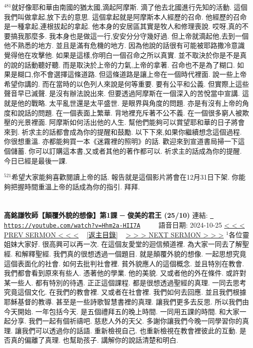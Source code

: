 \documentclass{book}
\begin{document}
$^{481}$就好像耶和華由南國的猶太國,滴起阿摩斯.
滴了他去北國進行先知的活動.
這個我們叫做拿起,放下去的意思.
這個拿起就是阿摩斯本人經歷的召命.
他經歷的召命是一種拿起,連根拔起的拿起.
他本身的安居區其實是牧人和修理喪說.
哎呀,真的不要搞我那麼多.
我本身也是做這一行,安安分分守幾好過.
但上帝就滴起他,去到一個他不熟悉的地方.
並且是滿有危機的地方.
因為他說的話很有可能被耶路撒冷意識覺得他在攻擊他.
如果是這樣,你明白一個召命之所以真實.
並不取決於你是不是真的說的話動聽好聽.
而是取決於上帝的力氣,上帝的拿著.
召命也不是為了糊口.
如果是糊口,你不會選擇這條道路.
但這條道路是讓上帝在一個時代裡面.
說一些上帝希望你講的.
而在當時的以色列人來說是何等重要.
要有公平和公義.
但實際上這些聲音早已滅聲.
是沒有辦法說出來.
但要透過阿摩斯在一個深入的苦悅當中宣講.
這就是他的戰略.
太平亂世還是太平盛世.
是眼界與角度的問題.
亦是有沒有上帝的角度和說話的問題.
在一個表面上繁華.
背地裡充斥著不公不義.
在一個很多窮人被欺壓的光景裡面.
阿摩斯如何活出他的人生.
幫他們能夠可以賞望耶和華的日子將會來到.
祈求主的話都會成為你的提醒和鼓勵.
以下下來,如果你繼續想念這個過程.
你很想重溫.
亦都能夠買一本《迷霧裡的照明》的話.
歡迎來到宣道書局掃一下這個儲蓄.
你可以訂購這本書,又或者其他的著作都可以.
祈求主的話成為你的提醒.
今日已經是最後一課.

$^{521}$希望大家能夠喜歡閱讀上帝的話.
報告就是這個影片將會在12月31日下架.
你能夠把握時間重溫上帝的話成為你的指引.
拜拜.
\newpage



\section{}
\label{sec:Hhm2a_HII7A}
\textbf{高銘謙牧師【顛覆外貌的想像】第1課 ─ 俊美的君王 (25/10)}
\newline
\newline
連結: \href{https://youtube.com/watch?v=Hhm2a-HII7A}{\texttt{ https://youtube.com/watch?v=Hhm2a-HII7A}} ~~~~ 語音日期: 2024-10-25 
\newline
\newline
\hyperref[sec:P4IZ6PCS8no]{\small{< < < PREV SERMON < < <}}
~
\hyperref[sec:index]{\small{[返主目錄]}}
~
\hyperref[sec:ASwKQuSlcnY]{\small{> > > NEXT SERMON > > >}}
\newline
\newline
$^{1}$各位靈姐妹大家好.
很高興可以再一次.
在這個友愛堂的迴信頻道裡.
為大家一同去了解聖經.
和解釋聖經.
我們真的很想透過一個題目.
就是顛覆外貌的想像.
一起思想究竟這個表面化的社會.
如何去批判社會裡.
貧外貌應人的這個概念.
並且特別在教會.
我們都會看到原來有些人.
憑著他的學業.
他的美貌.
又或者他的外在條件.
或許對某一些人.
都有特別的待遇.
正正這個課程.
都是很想透過聖經的真理.
一同去思考究竟這個文化.
在我們的教會裡.
又或者在社會裡.
我們如何去回應.
並且我們根據耶穌基督的教導.
甚至是一些詩歌智慧書裡的真理.
讓我們更多去反思.
所以我們由今天開始.
一年包括今天.
是五個禮拜五的晚上時間.
一同用五課的時間.
和大家一起分享.
我們一起有個祈禱吧.
慈悲人外的天父.
多謝你讓我們今晚一同學習你的真理.
讓我們可以透過你的話語.
重新檢視自己.
也重新檢視在教會裡彼此的互動.
是否真的偏離了真理.
也幫助孩子.
講解你的說話清楚和明白.
\end{document}
